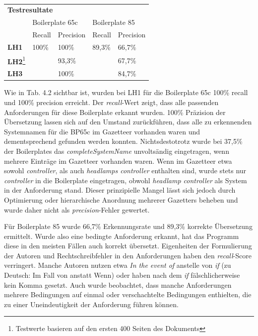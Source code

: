 \documentclass[12pt]{report}
\begin{document}
\vspace{12pt}
\begin{table}[h!]
\tt
\begin{tabular}{lllll}
\multicolumn{5}{l}{\textbf{Testresultate}}                                                                            \\
\multicolumn{1}{l|}{}             & \multicolumn{2}{l|}{Boilerplate 65c}    & \multicolumn{2}{l|}{Boilerplate 85}     \\
\multicolumn{1}{l|}{}             & Recall & \multicolumn{1}{l|}{Precision} & Recall & \multicolumn{1}{l|}{Precision} \\ \hline
\multicolumn{1}{l|}{\textbf{LH1}} & 100\%  & \multicolumn{1}{l|}{100\%}     & 89,3\% & \multicolumn{1}{l|}{66,7\%}    \\
\multicolumn{1}{l|}{\textbf{LH2}\footnote{Testwerte basieren auf den ersten 400 Seiten des Dokuments}} &        & \multicolumn{1}{l|}{93,3\%} &  	  &  \multicolumn{1}{l|}{67,7\%}          \\
\multicolumn{1}{l|}{\textbf{LH3}} &   & \multicolumn{1}{l|}{100\%}     & 	  & \multicolumn{1}{l|}{84,7\%}    
\end{tabular}
\rm
{}
\end{table}
\vspace{12pt}

Wie in Tab. 4.2 sichtbar ist, wurden bei LH1 für die Boilerplate 65c 100\% recall und 100\% precision erreicht. Der \textit{recall}-Wert zeigt, dass alle passenden Anforderungen für diese Boilerplate erkannt wurden. 100\% Präzision der Übersetzung lassen sich auf den Umstand zurückführen, dass alle zu erkennenden Systemnamen für die BP65c im Gazetteer vorhanden waren und dementsprechend gefunden werden konnten. Nichtsdestotrotz wurde bei 37,5\% der Boilerplates das \textit{completeSystemName} unvoltsändig eingetragen, wenn mehrere Einträge im Gazetteer vorhanden waren. Wenn im Gazetteer etwa sowohl \textit{controller}, als auch \textit{headlamps controller} enthalten sind, wurde stets nur \textit{controller} in die Boilerplate eingetragen, obwohl \textit{headlamp controller} als System in der Anforderung stand. Dieser prinzipielle Mangel lässt sich jedoch durch Optimierung oder hierarchische Anordnung mehrerer Gazetters beheben und wurde daher nicht als \textit{precision}-Fehler gewertet.

Für Boilerplate 85 wurde 66,7\% Erkennungsrate und 89,3\% korrekte Übersetzung ermittelt. Wurde also eine bedingte Anforderung erkannt, hat das Programm diese in den meisten Fällen auch korrekt übersetzt. Eigenheiten der Formulierung der Autoren und Rechtschreibfehler in den Anforderungen haben den \textit{recall}-Score verringert. Manche Autoren nutzen etwa \glqq \textit{In the event of}\grqq{} anstelle von \glqq \textit{if}\grqq{} (zu Deutsch: \glqq Im Fall von\grqq{} anstatt \glqq Wenn\grqq{}) oder haben nach dem \textit{if} fälschlicherweise kein Komma gesetzt. Auch wurde beobachtet, dass manche Anforderungen mehrere Bedingungen auf einmal oder verschachtelte Bedingungen enthielten, die zu einer Uneindeutigkeit der Anforderung führen können.
\end{document}
